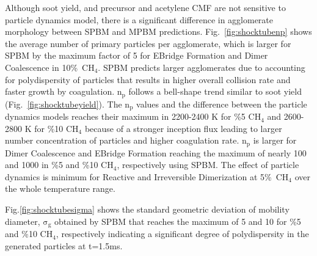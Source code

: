 Although soot yield, and precursor and acetylene CMF are not sensitive to particle dynamics model, there is a significant difference in agglomerate morphology between SPBM and MPBM predictions. Fig.~\ref{fig:shocktubenp} shows the average number of primary particles per agglomerate, which is larger for SPBM by the maximum factor of 5 for EBridge Formation and Dimer Coalescence in 10\%~$\mathrm{CH_4}$. SPBM predicts larger agglomerates due to accounting for polydispersity of particles that results in higher overall collision rate and faster growth by coagulation. $\mathrm{n_p}$ follows a bell-shape trend similar to soot yield (Fig.~\ref{fig:shocktubeyield}). The $\mathrm{n_p}$ values and the difference between the particle dynamics models reaches their maximum in 2200-2400 K for \%5 $\mathrm{CH_4}$ and 2600-2800 K for \%10 $\mathrm{CH_4}$ because of a stronger inception flux leading to larger number concentration of particles and higher coagulation rate. $\mathrm{n_p}$ is larger for Dimer Coalescence and EBridge Formation reaching the maximum of nearly 100 and 1000 in \%5 and \%10 $\mathrm{CH_4}$, respectively using SPBM. The effect of particle dynamics is minimum for Reactive and Irreversible Dimerization at 5\%~$\mathrm{CH_4}$ over the whole temperature range. 

Fig.\ref{fig:shocktubesigma} shows the standard geometric deviation of mobility diameter, $\mathrm{\sigma_{g}}$ obtained by SPBM that reaches the maximum of 5 and 10 for \%5 and \%10 $\mathrm{CH_4}$, respectively indicating a significant degree of polydispersity in the generated particles at t=1.5ms.


